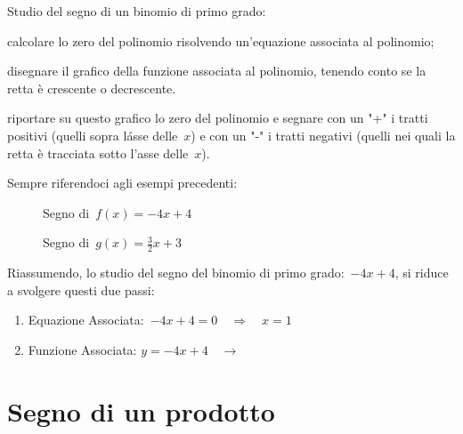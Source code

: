 \begin{procedura}
 Studio del segno di un binomio di primo grado:
\begin{enumeratea}
\item calcolare lo zero del polinomio risolvendo un'equazione associata al
 polinomio;
\item disegnare il grafico della funzione associata al polinomio,
 tenendo conto se la retta è crescente o decrescente.
\item riportare su questo grafico lo zero del polinomio e segnare con un
 "+" i tratti positivi (quelli sopra l\'asse delle~$x$) e con un "-" i tratti
 negativi (quelli nei quali la retta è tracciata sotto l'asse delle~$x$).
\end{enumeratea}
\end{procedura}

Sempre riferendoci agli esempi precedenti:

\begin{inaccessibleblock}
 \begin{figure}[h]
 \centering
 \begin{minipage}[]{.45\textwidth}
  \centering
  \caption{Segno di~$f(x) = -4 x +4$}
 \end{minipage}
 \begin{minipage}[]{.45\textwidth}
  \centering
  \caption{Segno di~$g(x) = \frac{3}{2} x +3$}
 \end{minipage}
\end{figure}
\end{inaccessibleblock}

Riassumendo, lo studio del segno del binomio di primo grado:~$-4 x +4$,
si riduce a svolgere questi due passi:

\begin{enumerate}
 \item
  Equazione Associata:~$-4 x +4 = 0 \quad \Rightarrow \quad x = 1$
 \item
  \begin{minipage}{.45\textwidth}
  Funzione Associata: $y = -4 x +4 \quad \rightarrow$
  \end{minipage}
  \begin{minipage}{.30\textwidth}
  
  \end{minipage}
\end{enumerate}

\section{Segno di un prodotto}
\label{sec:dis_prodotto}

